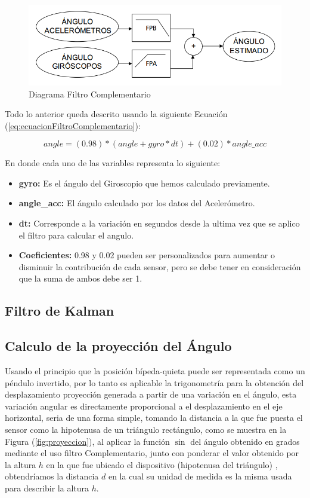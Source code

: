 \documentclass[12pt,a4paper]{article}
\begin{document}
\begin{figure}[H]
\centering
	\includegraphics[scale=0.5]{images/FiltroComplementario}
	\caption{Diagrama Filtro Complementario}
    \label{fig:diagramafiltrocomplementario}
\end{figure}

Todo lo anterior queda descrito usando la siguiente Ecuación (\ref{eq:ecuacionFiltroComplementario}):

\begin{equation}
\label{eq:ecuacionFiltroComplementario}
angle = (0.98)*(angle+gyro*dt)+(0.02)*angle\_acc
\end{equation}

En donde cada uno de las variables representa lo siguiente:
\begin{itemize}
\item \textbf{gyro:} Es el ángulo del Giroscopio que hemos calculado previamente.
\item \textbf{angle\_acc:} El ángulo calculado por los datos del Acelerómetro.
\item \textbf{dt:} Corresponde a la variación en segundos desde la ultima vez que se aplico el filtro para calcular el angulo.
\item \textbf{Coeficientes:}  0.98 y 0.02 pueden ser personalizados para aumentar o disminuir la contribución de cada sensor, pero se debe tener en consideración que la suma de ambos debe ser 1.
\end{itemize}

\subsection{Filtro de Kalman}

\subsection{Calculo de la proyección del Ángulo}
 Usando el principio que la posición bípeda-quieta puede ser representada como un péndulo invertido, por lo tanto es aplicable la trigonometría para la obtención del desplazamiento proyección generada a partir de una variación en el ángulo, esta variación angular es directamente proporcional a el desplazamiento en el eje horizontal, seria de una forma simple, tomando la distancia a la que fue puesta el sensor como la hipotenusa de un triángulo rectángulo, como se muestra en la Figura (\ref{fig:proyeccion}), al aplicar la función $\sin$ del ángulo obtenido en grados mediante el uso filtro Complementario, junto con ponderar el valor obtenido por la altura $h$ en la que fue ubicado el dispositivo (hipotenusa del triángulo) , obtendríamos la distancia $d$ en la cual su unidad de medida es la misma usada para describir la altura $h$.
 
\end{document}
